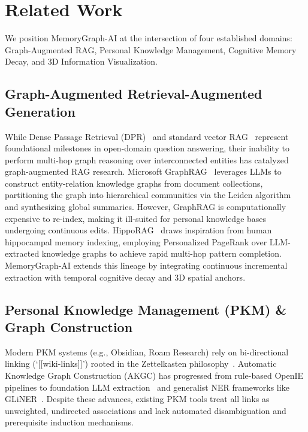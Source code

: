 \section{Related Work}
\label{sec:related_work}

We position MemoryGraph-AI at the intersection of four established domains: Graph-Augmented RAG, Personal Knowledge Management, Cognitive Memory Decay, and 3D Information Visualization.

\subsection{Graph-Augmented Retrieval-Augmented Generation}
While Dense Passage Retrieval (DPR)~\cite{karpukhin2020dpr} and standard vector RAG~\cite{lewis2020rag} represent foundational milestones in open-domain question answering, their inability to perform multi-hop graph reasoning over interconnected entities has catalyzed graph-augmented RAG research. Microsoft GraphRAG~\cite{edge2024graphrag} leverages LLMs to construct entity-relation knowledge graphs from document collections, partitioning the graph into hierarchical communities via the Leiden algorithm and synthesizing global summaries. However, GraphRAG is computationally expensive to re-index, making it ill-suited for personal knowledge bases undergoing continuous edits. HippoRAG~\cite{gutierrez2024hipporag} draws inspiration from human hippocampal memory indexing, employing Personalized PageRank over LLM-extracted knowledge graphs to achieve rapid multi-hop pattern completion. MemoryGraph-AI extends this lineage by integrating continuous incremental extraction with temporal cognitive decay and 3D spatial anchors.

\subsection{Personal Knowledge Management (PKM) \& Graph Construction}
Modern PKM systems (e.g., Obsidian, Roam Research) rely on bi-directional linking (`[[wiki-links]]') rooted in the Zettelkasten philosophy~\cite{ahrens2017smartnotes}. Automatic Knowledge Graph Construction (AKGC) has progressed from rule-based OpenIE pipelines to foundation LLM extraction~\cite{wang2023llmkg} and generalist NER frameworks like GLiNER~\cite{zaratiana2023gliner}. Despite these advances, existing PKM tools treat all links as unweighted, undirected associations and lack automated disambiguation and prerequisite induction mechanisms.

